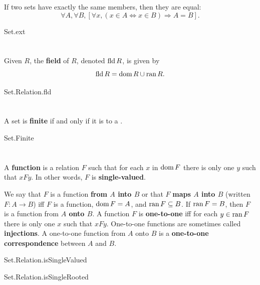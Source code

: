 \documentclass{report}
\begin{document}
  If two sets have exactly the same members, then they are equal:
    $$\forall A, \forall B,
        \left[\forall x, (x \in A \iff x \in B) \Rightarrow A = B\right].$$

    {Set.ext}

\section{}%

  Given  $R$, the \textbf{field} of $R$, denoted $\mathop{\text{fld}}{R}$,
    is given by $$\mathop{\text{fld}}{R} = \mathop{\text{dom}}{R} \cup \mathop{\text{ran}}{R}.$$

    {Set.Relation.fld}

\section{}%

  A set is \textbf{finite} if and only if it is  to a
    .

    {Set.Finite}

\section{}%

  A \textbf{function} is a relation $F$ such that for each $x$ in $\mathop{\text{dom}}{F}$
    there is only one $y$ such that $xFy$.
  In other words, $F$ is \textbf{single-valued}.

  We say that $F$ is a function \textbf{from $A$ into $B$} or that $F$
    \textbf{maps $A$ into $B$} (written $F \colon A \rightarrow B$) iff $F$ is a
    function, $\mathop{\text{dom}}{F} = A$, and $\mathop{\text{ran}}{F} \subseteq B$.
  If $\mathop{\text{ran}}{F} = B$, then $F$ is a function from \textbf{$A$ onto $B$}.
  A function $F$ is \textbf{one-to-one} iff for each $y \in \mathop{\text{ran}}{F}$ there is
    only one $x$ such that $xFy$.
  One-to-one functions are sometimes called \textbf{injections}.
  A one-to-one function from $A$ onto $B$ is a
    \textbf{one-to-one correspondence} between $A$ and $B$.

    {Set.Relation.isSingleValued}

    {Set.Relation.isSingleRooted}
\end{document}
